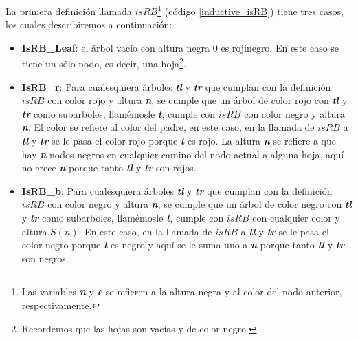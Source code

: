La primera definici\'on llamada \hyperref[inductive_isRB]{$isRB$}\footnote{Las variables \textit{\textbf{n}} y \textit{\textbf{c}} se refieren a la altura negra y al color del nodo anterior, respectivamente.} (c\'odigo \ref{inductive_isRB}) 
tiene tres casos, los cuales describiremos a continuaci\'on:
\begin{itemize}
        \item \textbf{IsRB\_Leaf}: el árbol vacío con altura negra 0 es rojinegro. En este caso
        se tiene un s\'olo nodo, es decir, una hoja\footnote{Recordemos que las hojas son vac\'ias y de
        color negro.}.
        \item \textbf{IsRB\_r}: Para cualesquiera \'arboles \textbf{\textit{tl}} y 
        \textbf{\textit{tr}} que cumplan con la definici\'on \hyperref[inductive_isRB]{$isRB$} con 
        color rojo y altura \textbf{\textit{n}}, se cumple que un \'arbol de color rojo con 
        \textbf{\textit{tl}} y \textbf{\textit{tr}} como subarboles, llam\'emosle \textbf{\textit{t}}, cumple 
        con \hyperref[inductive_isRB]{$isRB$} con color negro y altura \textbf{\textit{n}}. El color 
        se refiere al color del padre, en este caso, en la llamada de 
        \hyperref[inductive_isRB]{$isRB$} a \textbf{\textit{tl}} y \textbf{\textit{tr}} se le pasa 
        el color rojo porque \textbf{\textit{t}} es rojo. La altura \textbf{\textit{n}} se refiere a 
        que hay \textbf{\textit{n}} nodos negros en cualquier camino del nodo actual a alguna hoja, 
        aqu\'i no crece \textbf{\textit{n}} porque tanto
        \textbf{\textit{tl}} y \textbf{\textit{tr}} son rojos.
        \item \textbf{IsRB\_b}: Para cualesquiera \'arboles \textbf{\textit{tl}} y 
        \textbf{\textit{tr}} que cumplan con la definici\'on \hyperref[inductive_isRB]{$isRB$} con 
        color negro y altura \textbf{\textit{n}}, se cumple que un \'arbol de color negro con 
        \textbf{\textit{tl}} y \textbf{\textit{tr}} como subarboles, llam\'emosle \textbf{\textit{t}}, cumple 
        con \hyperref[inductive_isRB]{$isRB$} con cualquier color y altura $S(n)$. En este caso, en 
        la llamada de \hyperref[inductive_isRB]{$isRB$} a \textbf{\textit{tl}} y 
        \textbf{\textit{tr}} se le pasa el color negro porque \textbf{\textit{t}} es negro y aqu\'i se 
        le suma uno a \textbf{\textit{n}} porque tanto \textbf{\textit{tl}} y \textbf{\textit{tr}} 
        son negros.
\end{itemize}

